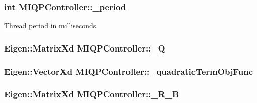 \hypertarget{classMIQPController_aed2ce53008e32e64e107398d85e75170}{
\subsubsection[{\-\_\-period}]{\setlength{\rightskip}{0pt plus 5cm}int {\bf \-M\-I\-Q\-P\-Controller\-::\-\_\-period}}}\label{classMIQPController_aed2ce53008e32e64e107398d85e75170}
\hyperlink{classThread}{\-Thread} period in milliseconds \hypertarget{classMIQPController_ac6404f74d6002d6a0ca4bd2d0b41d548}{
\subsubsection[{\-\_\-\-Q}]{\setlength{\rightskip}{0pt plus 5cm}\-Eigen\-::\-Matrix\-Xd {\bf \-M\-I\-Q\-P\-Controller\-::\-\_\-\-Q}}}\label{classMIQPController_ac6404f74d6002d6a0ca4bd2d0b41d548}
\hypertarget{classMIQPController_a532459bb659a1cc39d449fdf3f81c63f}{
\subsubsection[{\-\_\-quadratic\-Term\-Obj\-Func}]{\setlength{\rightskip}{0pt plus 5cm}\-Eigen\-::\-Vector\-Xd {\bf \-M\-I\-Q\-P\-Controller\-::\-\_\-quadratic\-Term\-Obj\-Func}}}\label{classMIQPController_a532459bb659a1cc39d449fdf3f81c63f}
\hypertarget{classMIQPController_a69fbc25a2e2f2392fe0f92c5811c12dd}{
\subsubsection[{\-\_\-\-R\-\_\-\-B}]{\setlength{\rightskip}{0pt plus 5cm}\-Eigen\-::\-Matrix\-Xd {\bf \-M\-I\-Q\-P\-Controller\-::\-\_\-\-R\-\_\-\-B}}}\label{classMIQPController_a69fbc25a2e2f2392fe0f92c5811c12dd}
